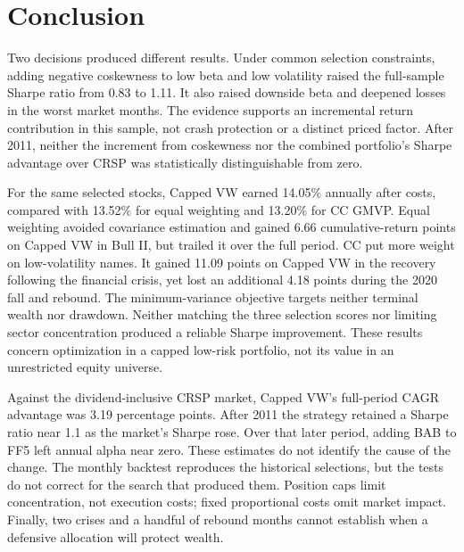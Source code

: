 \documentclass[letterpaper,journal]{IEEEtran}
\begin{document}
\section{Conclusion}
Two decisions produced different results. Under common selection constraints, adding negative coskewness to low beta and low volatility raised the full-sample Sharpe ratio from 0.83 to 1.11. It also raised downside beta and deepened losses in the worst market months. The evidence supports an incremental return contribution in this sample, not crash protection or a distinct priced factor. After 2011, neither the increment from coskewness nor the combined portfolio's Sharpe advantage over CRSP was statistically distinguishable from zero.

For the same selected stocks, Capped VW earned 14.05\% annually after costs, compared with 13.52\% for equal weighting and 13.20\% for CC GMVP. Equal weighting avoided covariance estimation and gained 6.66 cumulative-return points on Capped VW in Bull II, but trailed it over the full period. CC put more weight on low-volatility names. It gained 11.09 points on Capped VW in the recovery following the financial crisis, yet lost an additional 4.18 points during the 2020 fall and rebound. The minimum-variance objective targets neither terminal wealth nor drawdown. Neither matching the three selection scores nor limiting sector concentration produced a reliable Sharpe improvement. These results concern optimization in a capped low-risk portfolio, not its value in an unrestricted equity universe.

Against the dividend-inclusive CRSP market, Capped VW's full-period CAGR advantage was 3.19 percentage points. After 2011 the strategy retained a Sharpe ratio near 1.1 as the market's Sharpe rose. Over that later period, adding BAB to FF5 left annual alpha near zero. These estimates do not identify the cause of the change. The monthly backtest reproduces the historical selections, but the tests do not correct for the search that produced them. Position caps limit concentration, not execution costs; fixed proportional costs omit market impact. Finally, two crises and a handful of rebound months cannot establish when a defensive allocation will protect wealth.

\FloatBarrier
\appendices
\end{document}
